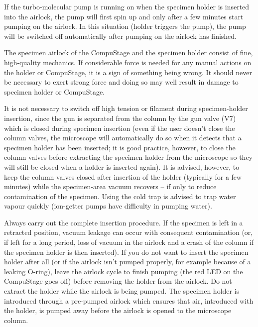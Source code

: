\documentclass[12pt]{article}
\begin{document}
If the turbo-molecular pump is running on when the specimen holder is
inserted into the airlock, the pump will first spin up and only after a
few minutes start pumping on the airlock. In this situation (holder
triggers the pump), the pump will be switched off automatically after
pumping on the airlock has finished.

The specimen airlock of the CompuStage and the specimen holder consist
of fine, high-quality mechanics. If considerable force is needed for
any manual actions on the holder or CompuStage, it is a sign of
something being wrong. It should never be necessary to exert strong
force and doing so may well result in damage to specimen holder or
CompuStage.

It is not necessary to switch off high tension or filament during
specimen-holder insertion, since the gun is separated from the column
by the gun valve (V7) which is closed during specimen insertion
(even if the user doesn't close the column valves, the microscope will
automatically do so when it detects that a specimen holder has been
inserted; it is good practice, however, to close the column valves
before extracting the specimen holder from the microscope so they will
still be closed when a holder is inserted again). It is advised,
however, to keep the column valves closed after insertion of the holder
(typically for a few minutes) while the specimen-area vacuum
recovers -- if only to reduce contamination of the specimen. Using the
cold trap is advised to trap water vapour quickly (ion-getter pumps
have difficulty in pumping water).

Always carry out the complete insertion procedure. If the specimen is
left in a retracted position, vacuum leakage can occur with consequent
contamination (or, if left for a long period, loss of vacuum in
the airlock and a crash of the column if the specimen holder is then
inserted). If you do not want to insert the specimen holder after all
(or if the airlock isn't pumped properly, for example because of a
leaking O-ring), leave the airlock cycle to finish pumping (the red
LED on the CompuStage goes off) before removing the holder from the
airlock. Do not extract the holder while the airlock is being pumped.
The specimen holder is introduced through a pre-pumped airlock which
ensures that air, introduced with the holder, is pumped away before the
airlock is opened to the microscope column.
\end{document}
